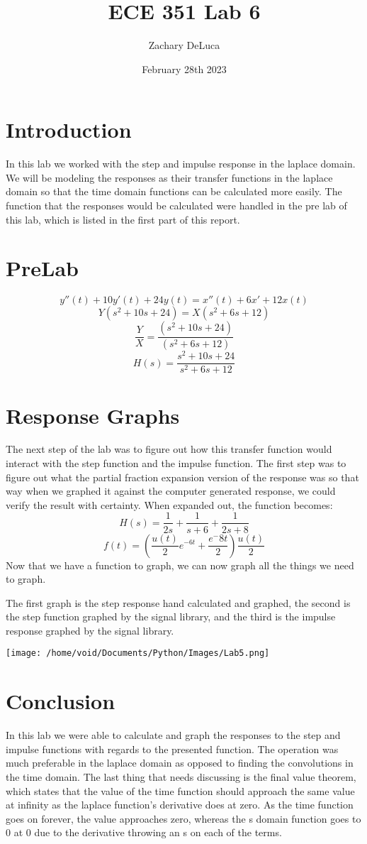 \documentclass[12pt,a4paper]{article}
\title{ECE 351 Lab 6}
\author{Zachary DeLuca}
\date{February 28th 2023}
\begin{document}
	
\maketitle
\hline
\section{Introduction}
	In this lab we worked with the step and impulse response in the laplace domain. We will be modeling the responses as their transfer functions in the laplace domain so that the time domain functions can be calculated more easily. The function that the responses would be calculated were handled in the pre lab of this lab, which is listed in the first part of this report. \\
\section{PreLab}
	$$y''(t)+10y'(t)+24y(t)=x''(t)+6x'+12x(t)$$
	$$Y(s^2+10s+24)=X(s^2+6s+12)$$
	$$\frac{Y}{X}=\frac{(s^2+10s+24)}{(s^2+6s+12)}$$
	$$H(s)=\frac{s^2+10s+24}{s^2+6s+12}$$
\section{Response Graphs}
	The next step of the lab was to figure out how this transfer function would interact with the step function and the impulse function. The first step was to figure out what the partial fraction expansion version of the response was so that way when we graphed it against the computer generated response, we could verify the result with certainty. When expanded out, the function becomes:
	$$H(s)=\frac{1}{2s}+\frac{1}{s+6}+\frac{1}{2s+8}$$
	$$f(t)=(\frac{u(t)}{2}e^{-6t}+\frac{e^-8t}{2})\frac{u(t)}{2}$$
	Now that we have a function to graph, we can now graph all the things we need to graph. \vspace*{12pt}
	
	The first graph is the step response hand calculated and graphed, the second is the step function graphed by the signal library, and the third is the impulse response graphed by the signal library. \vspace*{12pt}
	\begin{center}
		\texttt{[image: /home/void/Documents/Python/Images/Lab5.png]}
	\end{center}
\section{Conclusion}
	In this lab we were able to calculate and graph the responses to the step and impulse functions with regards to the presented function. The operation was much preferable in the laplace domain as opposed to finding the convolutions in the time domain. The last thing that needs discussing is the final value theorem, which states that the value of the time function should approach the same value at infinity as the laplace function's derivative does at zero. As the time function goes on forever, the value approaches zero, whereas the s domain function goes to 0 at 0 due to the derivative throwing an s on each of the terms.  
\end{document}
